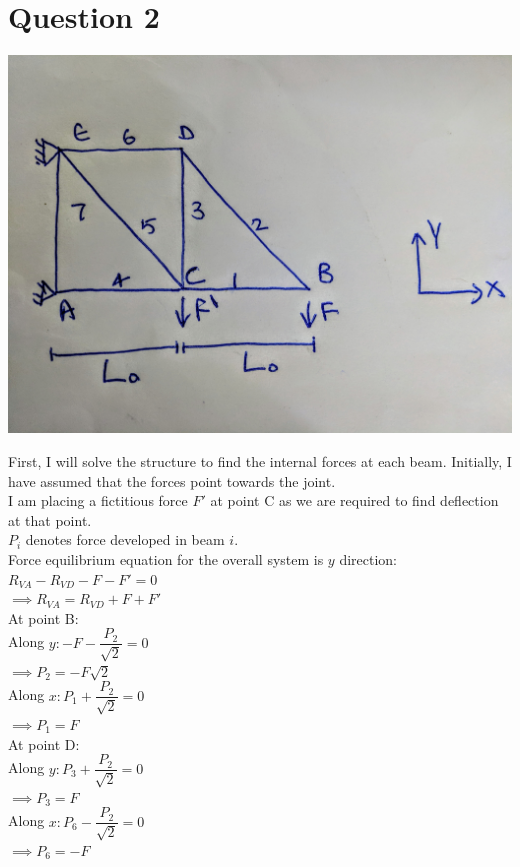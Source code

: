 \documentclass{article}
\begin{document}
\bigbreak

\section{Question 2}

\includegraphics[scale=0.05]{Q2.jpg}

\noindent First, I will solve the structure to find the internal forces at each beam. Initially, I have assumed that the forces point towards the joint.\\
I am placing a fictitious force $F'$ at point C as we are required to find deflection at that point.\\
$P_i$ denotes force developed in beam $i$. \\

\noindent Force equilibrium equation for the overall system is $y$ direction:\\ 
$R_{VA}-R_{VD}-F-F'=0$\\
$\implies R_{VA}=R_{VD}+F+F'$\\

\noindent At point B:\\
Along $y: -F-\dfrac{P_2}{\sqrt{2}}=0$\\
$\implies P_2= -F\sqrt{2}$\\
Along $x: P_1+\dfrac{P_2}{\sqrt{2}}=0$\\
$\implies P_1=F$\\

\noindent At point D:\\
Along $y: P_3+\dfrac{P_2}{\sqrt{2}}=0$\\
$\implies P_3=F$\\
Along $x: P_6-\dfrac{P_2}{\sqrt{2}}=0$\\
$\implies P_6= -F$\\
\end{document}
